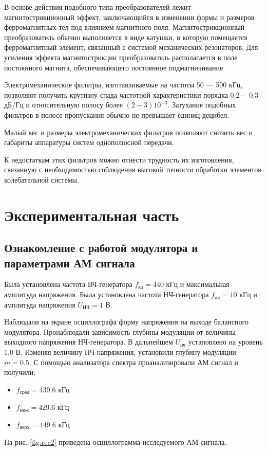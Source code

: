 В основе действия подобного типа преобразователей лежит магнитострикционный эффект, заключающийся в изменении формы и размеров ферромагнитных тел под влиянием магнитного поля. Магнитострикционный преобразователь обычно выполняется в виде катушки, в которую помещается ферромагнитный элемент, связанный с системой механических резонаторов. Для усиления эффекта магнитострикции преобразователь располагается в поле постоянного магнита, обеспечивающего постоянное подмагничивание.

Электромеханические фильтры, изготавливаемые на частоты 50 — 500 кГц, позволяют получить крутизну спада частотной характеристики порядка 0,2— 0,3 дБ/Гц и относительную полосу более $(2 - 3) 10^{-3}$. Затухание подобных
фильтров в полосе пропускания обычно не превышает единиц децибел.

Малый вес и размеры электромеханических фильтров позволяют снизить
вес и габариты аппаратуры систем однополюсной передачи. 

К недостаткам этих фильтров можно отнести трудность их изготовления, связанную с необходимостью соблюдения высокой точности обработки элементов колебательной системы.
\section{Экспериментальная часть}

\subsection{Ознакомление с работой модулятора и параметрами АМ сигнала}

Была установлена частота ВЧ-генератора $f_{\text{вч}}=440$ кГц и максимальная амплитуда напряжения.
Была установлена частота НЧ-генератора $f_{\text{нч}}=10$ кГц и  амплитуда напряжения 
$U_{\text{НЧ}} = 1 $ В.



Наблюдали на экране осциллографа форму напряжения на выходе балансного модулятора. Пронаблюдали зависимость глубины модуляции от величины выходного напряжения НЧ-генератора.
В дальнейшем $U_{\text{нч}}$ установлено на уровень 1.0 В. Изменяя величину НЧ-напряжения, установили глубину модуляции $m=0.5$. С помощью анализатора спектра проанализировали АМ сигнал и получили:

\begin{itemize}
	\item $f_{\text{сред}}=439.6$ кГц
	\item $f_{\text{ниж}}=429.6$ кГц
	\item $f_{\text{верх}}=449.6$ кГц
\end{itemize}
На рис. \ref{fig:rec2} приведена осциллограмма исследуемого АМ-сигнала.

